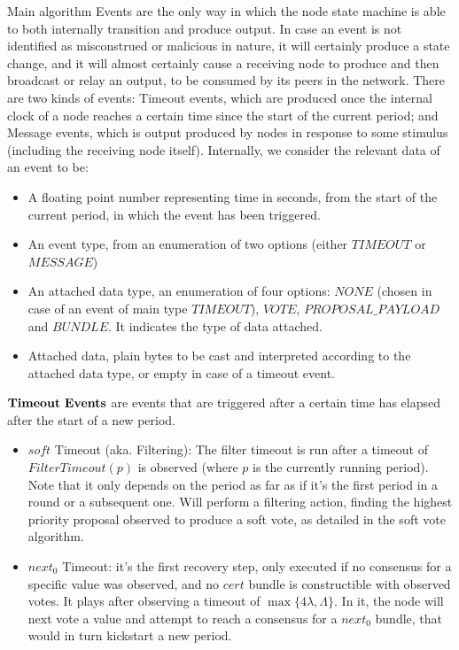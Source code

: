 \documentclass[10pt,a4paper]{article}
\begin{document}
\begin{section}{Main algorithm}
Events are the only way in which the node state machine is able to both internally transition and produce output.
In case an event is not identified as misconstrued or malicious in nature, it will certainly produce a state change,
and it will almost certainly cause a receiving node to produce and then broadcast or relay an output, to be consumed
by its peers in the network.
There are two kinds of events: Timeout events, which are produced once the internal clock of a node reaches a certain
time since the start of the current period; and Message events, which is output produced by nodes in response to some stimulus
(including the receiving node itself).
Internally, we consider the relevant data of an event to be:
\begin{itemize}
    \item A floating point number representing time in seconds, from the start of the current period, in which the event
    has been triggered.
    \item An event type, from an enumeration of two options (either $TIMEOUT$ or $MESSAGE$)
    \item An attached data type, an enumeration of four options: $NONE$ (chosen in case of an event of main type $TIMEOUT$), 
    $VOTE$, $PROPOSAL\_PAYLOAD$ and $BUNDLE$. It indicates the type of data attached.
    \item Attached data, plain bytes to be cast and interpreted according to the attached data type, or empty in case of a
    timeout event.
\end{itemize}

$\bold{Timeout \ Events}$ are events that are triggered after a certain time has elapsed after the start of a new period.
\begin{itemize}
    \item $soft$ Timeout (aka. Filtering): The filter timeout is run after a timeout of $FilterTimeout(p)$ is observed 
    (where $p$ is the currently running period). Note that it only depends on the period as far as if it's the first
    period in a round or a subsequent one.
    Will perform a filtering action, finding the highest priority proposal observed to produce a soft vote, as detailed
    in the soft vote algorithm.

    \item $next_0$ Timeout: it's the first recovery step, only executed if no consensus for a specific value was observed,
    and no $cert$ bundle is constructible with observed votes. It plays after observing a timeout of $\max\{4\lambda, \Lambda \}$.
    In it, the node will next vote a value and attempt to reach a consensus for a $next_0$ bundle, that would in turn kickstart
    a new period.


\end{itemize}
\end{section}
\end{document}
